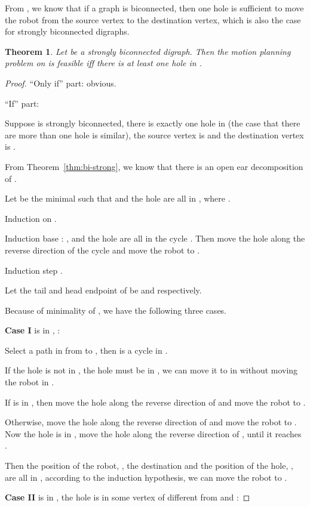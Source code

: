 \documentclass{article}
\newtheorem{thm}{Theorem}
\begin{document}
\smallskip
From \cite{PapadimitriouRST94}, we know that if a graph is
biconnected, then one hole is sufficient to move the robot from the
source vertex to the destination vertex, which is also the case for
strongly biconnected digraphs.
\begin{thm}\label{thm:feas-bi-strong}
Let  be a strongly biconnected digraph. Then the motion planning
problem on  is feasible iff there is at least one hole in .
\end{thm}
\begin{proof}

``Only if'' part: obvious.

``If'' part:

Suppose  is strongly biconnected, there is exactly one hole in
 (the case that there are more than one hole is similar), the
source vertex is  and the destination vertex is .

From Theorem~\ref{thm:bi-strong}, we know that there is an open ear
decomposition  of .

Let  be the minimal  such that  and the hole are all
in , where .

Induction on .

Induction base : ,  and the hole are all in the cycle
. Then move the hole along the reverse direction of the cycle
and move the robot to .

Induction step .

Let the tail and head endpoint of  be  and
 respectively.

Because of minimality of , we have the following three cases.

\textbf{Case I}  is in , :

Select a path  in  from  to , then
 is a cycle in .

If the hole is not in , the hole must be in
, we can move it to  in  without moving the
robot in .

If  is in , then move the hole along the reverse
direction of  and move the robot to .

Otherwise, move the hole along the reverse direction of  and move the robot to . Now the hole is in
, move the hole along the reverse direction of ,
until it reaches .

Then the position of the robot, , the destination  and
the position of the hole, , are all in ,
according to the induction hypothesis, we can move the robot to .

\textbf{Case II}  is in , the hole is in some vertex
of  different from  and :


\end{proof}
\end{document}
